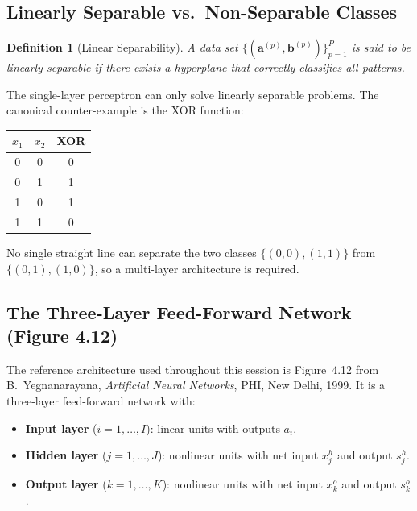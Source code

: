 \documentclass[12pt,a4paper]{article}
\newtheorem{definition}{Definition}[section]
\newcommand{\sho}{s_{j}^{h}}
\newcommand{\sko}{s_{k}^{o}}
\newcommand{\xho}{x_{j}^{h}}
\newcommand{\xko}{x_{k}^{o}}
\begin{document}
\subsection{Linearly Separable vs.\ Non-Separable Classes}

\begin{definition}[Linear Separability]
\label{def:linear-sep}
A data set $\{(\mathbf{a}^{(p)}, \mathbf{b}^{(p)})\}_{p=1}^{P}$ is said to be
\emph{linearly separable} if there exists a hyperplane that correctly classifies
all patterns.
\end{definition}

The single-layer perceptron can only solve linearly separable problems.  The
canonical counter-example is the XOR function:

\begin{center}
\begin{tabular}{ccc}
  \toprule
  $x_1$ & $x_2$ & XOR \\
  \midrule
  0 & 0 & 0 \\
  0 & 1 & 1 \\
  1 & 0 & 1 \\
  1 & 1 & 0 \\
  \bottomrule
\end{tabular}
\end{center}

No single straight line can separate the two classes $\{(0,0),(1,1)\}$ from
$\{(0,1),(1,0)\}$, so a multi-layer architecture is required.

\subsection{The Three-Layer Feed-Forward Network (Figure 4.12)}
\label{sub:three-layer}

The reference architecture used throughout this session is Figure~4.12 from
B.\ Yegnanarayana, \textit{Artificial Neural Networks}, PHI, New Delhi,
1999.  It is a three-layer feed-forward network with:

\begin{itemize}[noitemsep]
  \item \textbf{Input layer} ($i = 1,\ldots,I$): linear units with outputs
        $a_i$.
  \item \textbf{Hidden layer} ($j = 1,\ldots,J$): nonlinear units with net
        input $\xho$ and output $\sho$.
  \item \textbf{Output layer} ($k = 1,\ldots,K$): nonlinear units with net
        input $\xko$ and output $\sko$.
\end{itemize}
\end{document}
